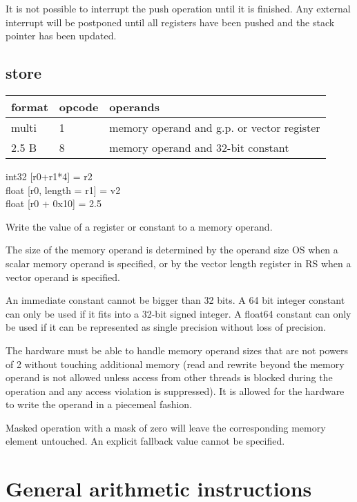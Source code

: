 \documentclass[forwardcom.tex]{subfiles}
\begin{document}
It is not possible to interrupt the push operation until it is finished. Any external interrupt will be postponed until all registers have been pushed and the stack pointer has been updated.
\vv


\subsection{store}
\label{table:storeInstruction}
\begin{tabular}{|p{12mm}|p{15mm}|p{100mm}|}
\hline
\bfseries format & \bfseries opcode & \bfseries operands \\ \hline
multi &  1 & memory operand and g.p. or vector register \\ \hline
2.5 B &  8 & memory operand and 32-bit constant \\ \hline
\end{tabular}
\vv

int32 [r0+r1*4] = r2\\ 
float [r0, length = r1] = v2 \\
float [r0 + 0x10] = 2.5
\vv

Write the value of a register or constant to a memory operand.
\vv

The size of the memory operand is determined by the operand size OS when a scalar memory operand is specified, or by the vector length register in RS when a vector operand is specified.
\vv

An immediate constant cannot be bigger than 32 bits. A 64 bit integer constant can only be used if it fits into a 32-bit signed integer. A float64 constant can only be used if it can be represented as single precision without loss of precision.
\vv

The hardware must be able to handle memory operand sizes that are not powers of 2 without touching additional memory (read and rewrite beyond the memory operand is not allowed unless access from other threads is blocked during the operation and any access violation is suppressed). 
It is allowed for the hardware to write the operand in a piecemeal fashion.
\vv

Masked operation with a mask of zero will leave the corresponding memory element untouched. An explicit fallback value cannot be specified.
\vv


\section{General arithmetic instructions}
\end{document}
